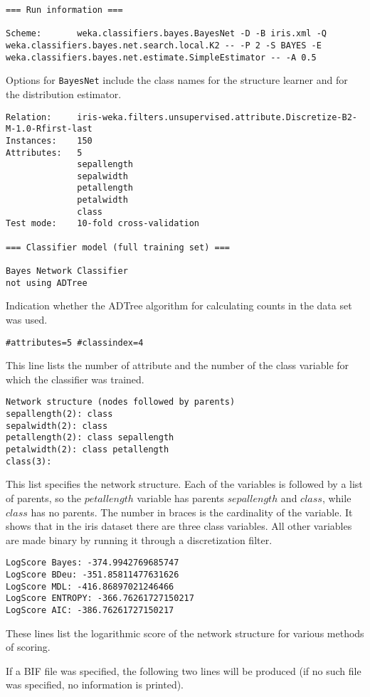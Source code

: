 \begin{verbatim}
=== Run information ===

Scheme:       weka.classifiers.bayes.BayesNet -D -B iris.xml -Q weka.classifiers.bayes.net.search.local.K2 -- -P 2 -S BAYES -E weka.classifiers.bayes.net.estimate.SimpleEstimator -- -A 0.5
\end{verbatim}
Options for \texttt{BayesNet} include the class names for the structure learner and for the 
distribution estimator.
\begin{verbatim}
Relation:     iris-weka.filters.unsupervised.attribute.Discretize-B2-M-1.0-Rfirst-last
Instances:    150
Attributes:   5
              sepallength
              sepalwidth
              petallength
              petalwidth
              class
Test mode:    10-fold cross-validation

=== Classifier model (full training set) ===

Bayes Network Classifier
not using ADTree
\end{verbatim}
Indication whether the ADTree algorithm \cite{Moore} for calculating counts in the
data set was used.
\begin{verbatim}
#attributes=5 #classindex=4
\end{verbatim}
This line lists the number of attribute and the number of the class variable for which the 
classifier was trained.

\begin{verbatim}
Network structure (nodes followed by parents)
sepallength(2): class 
sepalwidth(2): class 
petallength(2): class sepallength 
petalwidth(2): class petallength 
class(3): 
\end{verbatim}
This list specifies the network structure. Each of the variables is followed by
a list of parents, so the $petallength$ variable has parents $sepallength$ and $class$,
while $class$ has no parents. The number in braces is the cardinality of the variable.
It shows that in the iris dataset there are three class variables. All other variables
are made binary by running it through a discretization filter.

\begin{verbatim}
LogScore Bayes: -374.9942769685747
LogScore BDeu: -351.85811477631626
LogScore MDL: -416.86897021246466
LogScore ENTROPY: -366.76261727150217
LogScore AIC: -386.76261727150217
\end{verbatim}
These lines list the logarithmic score of the network structure for various methods
of scoring.

If a BIF file was specified, the following two lines will be produced (if no such
file was specified, no information is printed).

